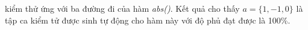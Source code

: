 kiểm thử ứng với ba đường đi của hàm \textit{abs()}. Kết quả cho thấy $a=\{1, -1, 0\}$ là tập ca kiểm tử được sinh tự động cho hàm này với độ phủ đạt được là 100\%.




 		

